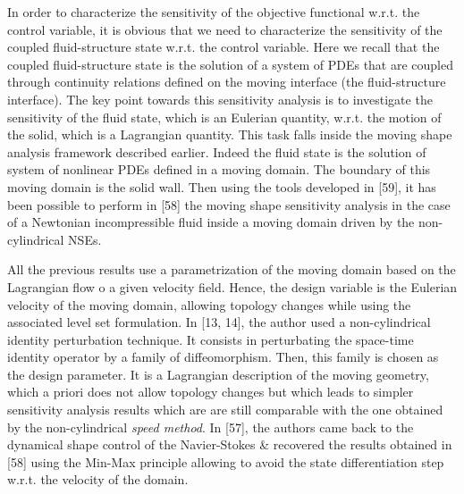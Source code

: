 \documentclass[oneside]{book}
\numberwithin{equation}{section}
\begin{document}
In order to characterize the sensitivity of the objective functional w.r.t. the control variable, it is obvious that we need to characterize the sensitivity of the coupled fluid-structure state w.r.t. the control variable. Here we recall that the coupled fluid-structure state is the solution of a system of PDEs that are coupled through continuity relations defined on the moving interface (the fluid-structure interface). The key point towards this sensitivity analysis is to investigate the sensitivity of the fluid state, which is an Eulerian quantity, w.r.t. the motion of the solid, which is a Lagrangian quantity. This task falls inside the moving shape analysis framework described earlier. Indeed the fluid state is the solution of system of nonlinear PDEs defined in a moving domain. The boundary of this moving domain is the solid wall. Then using the tools developed in [59], it has been possible to perform in [58] the moving shape sensitivity analysis in the case of a Newtonian incompressible fluid inside a moving domain driven by the non-cylindrical NSEs.

All the previous results use a parametrization of the moving domain based on the Lagrangian flow o a given velocity field. Hence, the design variable is the Eulerian velocity of the moving domain, allowing topology changes while using the associated level set formulation. In [13, 14], the author used a non-cylindrical identity perturbation technique. It consists in perturbating the space-time identity operator by a family of diffeomorphism. Then, this family is chosen as the design parameter. It is a Lagrangian description of the moving geometry, which a priori does not allow topology changes but which leads to simpler sensitivity analysis results which are are still comparable with the one obtained by the non-cylindrical \textit{speed method}. In [57], the authors came back to the dynamical shape control of the Navier-Stokes \& recovered the results obtained in [58] using the Min-Max principle allowing to avoid the state differentiation step w.r.t. the velocity of the domain.
\end{document}
